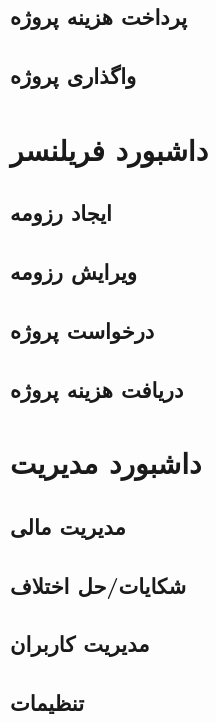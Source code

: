 \subsection{پرداخت هزینه پروژه}


\subsection{واگذاری پروژه}



\section{داشبورد فریلنسر}


\subsection{ایجاد رزومه}


\subsection{ویرایش رزومه}


\subsection{درخواست پروژه}


\subsection{دریافت هزینه پروژه}



\section{داشبورد مدیریت}


\subsection{مدیریت مالی}


\subsection{شکایات/حل اختلاف}


\subsection{مدیریت کاربران}


\subsection{تنظیمات}
%
